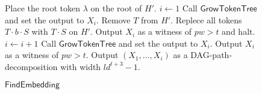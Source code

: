 \documentclass[runningheads]{llncs}
\theoremstyle{plain}
\theoremstyle{definition}
\begin{document}
\begin{figure}[!t]
\begin{algorithm}[H]
    \caption{$\mathsf{FindEmbedding}$}
	\label{findEmbedding}
	\begin{algorithmic}[1]
    \STATE Place the root token $\lambda$ on the root of $H'$.
    \STATE $i \leftarrow 1$
    \STATE Call $\mathsf{GrowTokenTree}$ and set the output to $X_i$.
    \STATE Remove $T$ from $H'$.
    \STATE Replece all tokens $T \cdot b \cdot S$ with $T \cdot S$ on $H'$.
    \ENDIF
    \ELSE
    \STATE Output $X_i$ as a witness of $pw > t$ and halt.
    \ENDIF
    \STATE $i \leftarrow i+1$
    \STATE Call $\mathsf{GrowTokenTree}$ and set the output to $X_i$.
    \ENDWHILE
    \STATE Output $X_i$ as a witness of $pw > t$.
    \ENDIF
    \STATE Output $(X_1,\ldots,X_i)$ as a DAG-path-decomposition with width $ld^{t+3}-1$.
    \ENDIF
	\end{algorithmic}
\end{algorithm}
\vspace{-1.5cm}
\end{figure}


\begin{comment}
\ifthenelse{\boolean{Draft}}{
\begin{figure}[t]
    \centering
    \texttt{[image: pic11.eps]}
    \caption{Illustration of the operation of $\mathsf{GrowTokenTree}$. The orange tokens in $M_{t, d, l}$ indicate \textit{tokened} tokens. Starting from each left state and ending with each right state. $\mathsf{GrowTokenTree}$ places tokens of $M_{t, d, l}$ onto vertices of $H'$ while preserving the tree structure}
    \label{fig:11}
\end{figure}
}
\end{comment}



\end{document}
